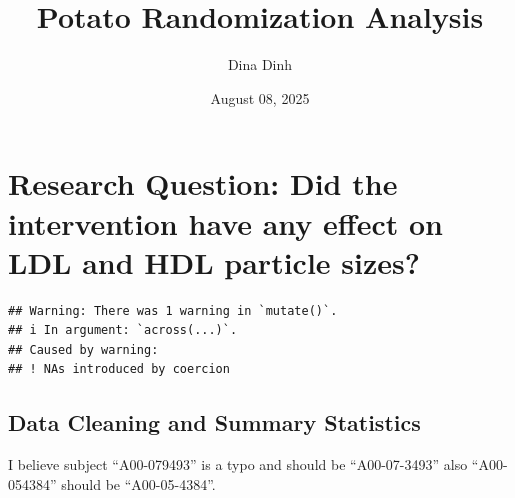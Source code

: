 \documentclass[
]{article}
\title{Potato Randomization Analysis}
\author{Dina Dinh}
\date{August 08, 2025}
\begin{document}
\maketitle

\section{Research Question: Did the intervention have any effect on LDL
and HDL particle
sizes?}\label{research-question-did-the-intervention-have-any-effect-on-ldl-and-hdl-particle-sizes}

\begin{verbatim}
## Warning: There was 1 warning in `mutate()`.
## i In argument: `across(...)`.
## Caused by warning:
## ! NAs introduced by coercion
\end{verbatim}

\subsection{Data Cleaning and Summary
Statistics}\label{data-cleaning-and-summary-statistics}

I believe subject ``A00-079493'' is a typo and should be ``A00-07-3493''
also ``A00-054384'' should be ``A00-05-4384''.
\end{document}
